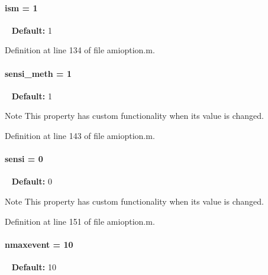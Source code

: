 \hypertarget{classamioption_aada9d6834569ad5c542cb8dc6b26ea46}{}
\paragraph[{ism}]{\setlength{\rightskip}{0pt plus 5cm}ism = 1}\label{classamioption_aada9d6834569ad5c542cb8dc6b26ea46}
~\newline
{\bfseries Default\+:} 1 

Definition at line 134 of file amioption.\+m.

\hypertarget{classamioption_ab31e219eb42bc06629c3f247a01b9906}{}
\paragraph[{sensi\+\_\+meth}]{\setlength{\rightskip}{0pt plus 5cm}sensi\+\_\+meth = 1}\label{classamioption_ab31e219eb42bc06629c3f247a01b9906}
~\newline
{\bfseries Default\+:} 1

\begin{DoxyNote}{Note}
This property has custom functionality when its value is changed. 
\end{DoxyNote}


Definition at line 143 of file amioption.\+m.

\hypertarget{classamioption_a7dd31d33463c5a709251bcef0eccaa36}{}
\paragraph[{sensi}]{\setlength{\rightskip}{0pt plus 5cm}sensi = 0}\label{classamioption_a7dd31d33463c5a709251bcef0eccaa36}
~\newline
{\bfseries Default\+:} 0

\begin{DoxyNote}{Note}
This property has custom functionality when its value is changed. 
\end{DoxyNote}


Definition at line 151 of file amioption.\+m.

\hypertarget{classamioption_a85519d27e7231ac625e5b2deee92165a}{}
\paragraph[{nmaxevent}]{\setlength{\rightskip}{0pt plus 5cm}nmaxevent = 10}\label{classamioption_a85519d27e7231ac625e5b2deee92165a}
~\newline
{\bfseries Default\+:} 10 

